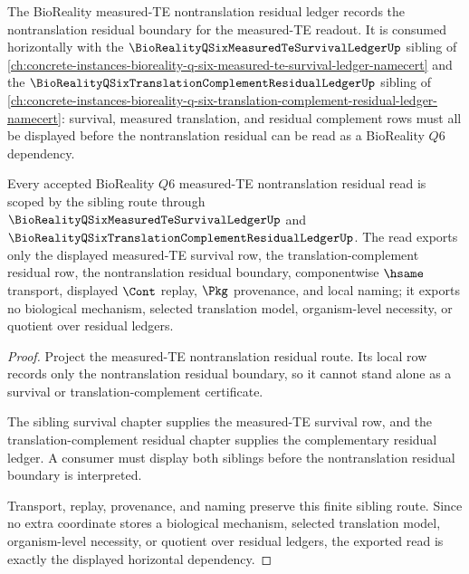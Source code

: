 The BioReality measured-TE nontranslation residual ledger records the nontranslation residual boundary for the measured-TE readout. It is consumed horizontally with the $\BioRealityQSixMeasuredTeSurvivalLedgerUp$ sibling of \autoref{ch:concrete-instances-bioreality-q-six-measured-te-survival-ledger-namecert} and the $\BioRealityQSixTranslationComplementResidualLedgerUp$ sibling of \autoref{ch:concrete-instances-bioreality-q-six-translation-complement-residual-ledger-namecert}: survival, measured translation, and residual complement rows must all be displayed before the nontranslation residual can be read as a BioReality $Q6$ dependency.

\begin{theorem}
\label{thm:bioreality-q-six-measured-te-residual-sibling-route}
Every accepted BioReality $Q6$ measured-TE nontranslation residual read is scoped by the sibling route through $\BioRealityQSixMeasuredTeSurvivalLedgerUp$ and $\BioRealityQSixTranslationComplementResidualLedgerUp$. The read exports only the displayed measured-TE survival row, the translation-complement residual row, the nontranslation residual boundary, componentwise $\hsame$ transport, displayed $\Cont$ replay, $\Pkg$ provenance, and local naming; it exports no biological mechanism, selected translation model, organism-level necessity, or quotient over residual ledgers.
\end{theorem}

\begin{proof}
Project the measured-TE nontranslation residual route. Its local row records only the nontranslation residual boundary, so it cannot stand alone as a survival or translation-complement certificate.

The sibling survival chapter supplies the measured-TE survival row, and the translation-complement residual chapter supplies the complementary residual ledger. A consumer must display both siblings before the nontranslation residual boundary is interpreted.

Transport, replay, provenance, and naming preserve this finite sibling route. Since no extra coordinate stores a biological mechanism, selected translation model, organism-level necessity, or quotient over residual ledgers, the exported read is exactly the displayed horizontal dependency.
\end{proof}

